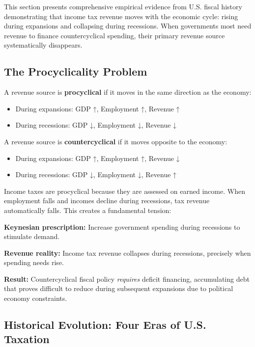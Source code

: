 \documentclass[12pt,letterpaper]{article}
\begin{document}
This section presents comprehensive empirical evidence from U.S. fiscal history demonstrating that income tax revenue moves with the economic cycle: rising during expansions and collapsing during recessions. When governments most need revenue to finance countercyclical spending, their primary revenue source systematically disappears.

\subsection{The Procyclicality Problem}

A revenue source is \textbf{procyclical} if it moves in the same direction as the economy:
\begin{itemize}
    \item During expansions: GDP ↑, Employment ↑, Revenue ↑
    \item During recessions: GDP ↓, Employment ↓, Revenue ↓
\end{itemize}

A revenue source is \textbf{countercyclical} if it moves opposite to the economy:
\begin{itemize}
    \item During expansions: GDP ↑, Employment ↑, Revenue ↓
    \item During recessions: GDP ↓, Employment ↓, Revenue ↑
\end{itemize}

Income taxes are procyclical because they are assessed on earned income. When employment falls and incomes decline during recessions, tax revenue automatically falls. This creates a fundamental tension:

\begin{tcolorbox}[colback=warningred!10,colframe=warningred,title=\textbf{The Keynesian Policy Dilemma}]
\textbf{Keynesian prescription:} Increase government spending during recessions to stimulate demand.

\textbf{Revenue reality:} Income tax revenue collapses during recessions, precisely when spending needs rise.

\textbf{Result:} Countercyclical fiscal policy \textit{requires} deficit financing, accumulating debt that proves difficult to reduce during subsequent expansions due to political economy constraints.
\end{tcolorbox}

\subsection{Historical Evolution: Four Eras of U.S. Taxation}
\end{document}

